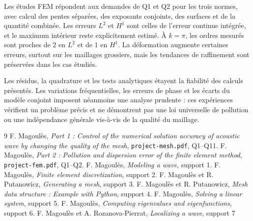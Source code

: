 \documentclass[12pt,a4paper]{article}
\begin{document}
Les études FEM répondent aux demandes de Q1 et Q2 pour les trois normes, avec calcul des pentes séparées, des exposants conjoints, des surfaces et de la quantité combinée. Les erreurs $L^2$ et $H^1$ sont celles de l'erreur continue intégrée, et le maximum intérieur reste explicitement estimé. À $k=\pi$, les ordres mesurés sont proches de 2 en $L^2$ et de 1 en $H^1$. La déformation augmente certaines erreurs, surtout sur les maillages grossiers, mais les tendances de raffinement sont préservées dans les cas étudiés.

Les résidus, la quadrature et les tests analytiques étayent la fiabilité des calculs présentés. Les variations fréquentielles, les erreurs de phase et les écarts du modèle conjoint imposent néanmoins une analyse prudente : ces expériences vérifient un problème précis et ne démontrent pas une loi universelle de pollution ou une indépendance générale vis-à-vis de la qualité du maillage.
\newpage
\par
\begingroup
\let\section\subsubsection
\begin{thebibliography}{9}
 F. Magoulès, \emph{Part 1 : Control of the numerical solution accuracy of acoustic wave by changing the quality of the mesh}, \texttt{project-mesh.pdf}, Q1--Q11.
 F. Magoulès, \emph{Part 2 : Pollution and dispersion error of the finite element method}, \texttt{project-fem.pdf}, Q1--Q2.
 F. Magoulès, \emph{Modeling a wave}, support 1.
 F. Magoulès, \emph{Finite element discretization}, support 2.
 F. Magoulès et R. Putanowicz, \emph{Generating a mesh}, support 3.
 F. Magoulès et R. Putanowicz, \emph{Mesh data structure : Example with Python}, support 4.
 F. Magoulès, \emph{Solving a linear system}, support 5.
 F. Magoulès, \emph{Computing eigenvalues and eigenfunctions}, support 6.
 F. Magoulès et A. Rozanova-Pierrat, \emph{Localizing a wave}, support 7
\end{thebibliography}
\endgroup
\end{document}
